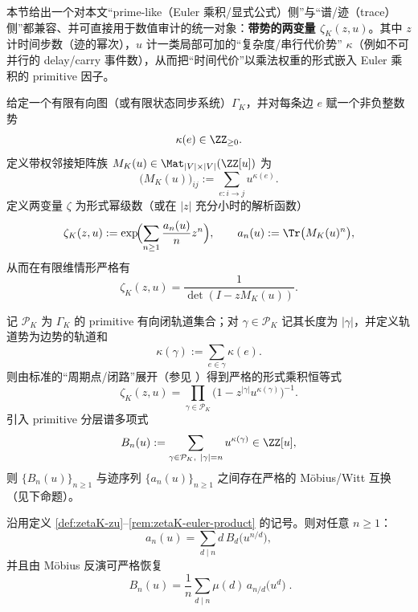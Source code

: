 本节给出一个对本文“prime-like（Euler 乘积/显式公式）侧”与“谱/迹（trace）侧”都兼容、并可直接用于数值审计的统一对象：\textbf{带势的两变量 \(\zeta_K(z,u)\)}。其中 \(z\) 计时间步数（迹的幂次），\(u\) 计一类局部可加的“复杂度/串行代价势” \(\kappa\)（例如不可并行的 delay/carry 事件数），从而把“时间代价”以乘法权重的形式嵌入 Euler 乘积的 primitive 因子。

\begin{definition}\label{def:zetaK-zu}
给定一个有限有向图（或有限状态同步系统）\(\Gamma_K\)，并对每条边 \(e\) 赋一个非负整数势
\[
\kappa(e)\in\ZZ_{\ge 0}.
\]
定义带权邻接矩阵族 \(M_K(u)\in \Mat_{|V|\times |V|}(\ZZ[u])\) 为
\[
\bigl(M_K(u)\bigr)_{ij}:=\sum_{e:i\to j} u^{\kappa(e)}.
\]
定义两变量 \(\zeta\) 为形式幂级数（或在 \(|z|\) 充分小时的解析函数）
\begin{equation}\label{eq:zetaK-trace-exp}
\zeta_K(z,u)
:=\exp\!\Bigl(\sum_{n\ge 1}\frac{a_n(u)}{n}z^n\Bigr),
\qquad
a_n(u):=\Tr\bigl(M_K(u)^n\bigr),
\end{equation}
从而在有限维情形严格有
\begin{equation}\label{eq:zetaK-det}
\zeta_K(z,u)=\frac{1}{\det(I-zM_K(u))}.
\end{equation}
\end{definition}

\begin{remark}\label{rem:zetaK-euler-product}
记 \(\mathcal{P}_K\) 为 \(\Gamma_K\) 的 primitive 有向闭轨道集合；对 \(\gamma\in\mathcal{P}_K\) 记其长度为 \(|\gamma|\)，并定义轨道势为边势的轨道和
\[
\kappa(\gamma):=\sum_{e\in\gamma}\kappa(e).
\]
则由标准的“周期点/闭路”展开（参见 \cite{ParryPollicott1990Zeta,LindMarcus1995}）得到严格的形式乘积恒等式
\begin{equation}\label{eq:zetaK-euler}
\zeta_K(z,u)=\prod_{\gamma\in\mathcal{P}_K}\bigl(1-z^{|\gamma|}u^{\kappa(\gamma)}\bigr)^{-1}.
\end{equation}
引入 primitive 分层谱多项式
\begin{equation}\label{eq:zetaK-Bn}
B_n(u):=\sum_{\gamma\in\mathcal{P}_K,\ |\gamma|=n} u^{\kappa(\gamma)}\in\ZZ[u],
\end{equation}
则 \(\{B_n(u)\}_{n\ge 1}\) 与迹序列 \(\{a_n(u)\}_{n\ge 1}\) 之间存在严格的 Möbius/Witt 互换（见下命题）。
\end{remark}

\begin{proposition}\label{prop:zetaK-mobius-primitive}
沿用定义 \ref{def:zetaK-zu}--\ref{rem:zetaK-euler-product} 的记号。则对任意 \(n\ge 1\)：
\begin{equation}\label{eq:zetaK-trace-from-primitive}
a_n(u)=\sum_{d\mid n} d\,B_d\!\bigl(u^{n/d}\bigr),
\end{equation}
并且由 Möbius 反演可严格恢复
\begin{equation}\label{eq:zetaK-primitive-from-trace}
\boxed{\;
B_n(u)=\frac{1}{n}\sum_{d\mid n}\mu(d)\,a_{n/d}\!\bigl(u^{d}\bigr)\; }.
\end{equation}
\end{proposition}

